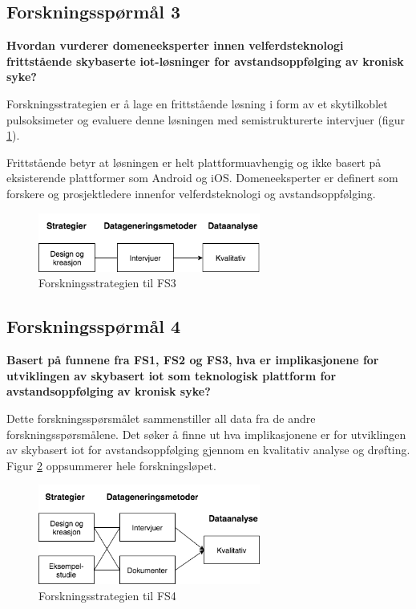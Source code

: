 \subsection{Forskningsspørmål 3}
\textbf{Hvordan vurderer domeneeksperter innen velferdsteknologi frittstående skybaserte \gls{iot}-løsninger
for avstandsoppfølging av kronisk syke?}

Forskningsstrategien er å lage en frittstående løsning i form av et skytilkoblet pulsoksimeter og evaluere
denne løsningen med semistrukturerte intervjuer (figur \ref{fig:oates_fs3}).
 
Frittstående betyr at løsningen er helt plattformuavhengig og ikke basert på eksisterende plattformer som Android og iOS.
Domeneeksperter er definert som forskere og prosjektledere innenfor velferdsteknologi og avstandsoppfølging.

\begin{figure}
\centering
\includegraphics[width=0.65\textwidth]{fig/oates/fs3}
\caption{Forskningsstrategien til FS3}
\label{fig:oates_fs3}
\end{figure}

\subsection{Forskningsspørmål 4}
\textbf{Basert på funnene fra FS1, FS2 og FS3, hva er implikasjonene for utviklingen av skybasert \gls{iot} som teknologisk plattform
    for avstandsoppfølging av kronisk syke?}

Dette forskningsspørsmålet sammenstiller all data fra de andre forskningsspørsmålene. Det søker å finne ut hva implikasjonene
er for utviklingen av skybasert \gls{iot} for avstandsoppfølging gjennom en kvalitativ analyse og drøfting.
Figur \ref{fig:oates_fs4} oppsummerer hele forskningsløpet.

\begin{figure}
\centering
\includegraphics[width=0.65\textwidth]{fig/oates/fs4}
\caption{Forskningsstrategien til FS4}
\label{fig:oates_fs4}
\end{figure}

